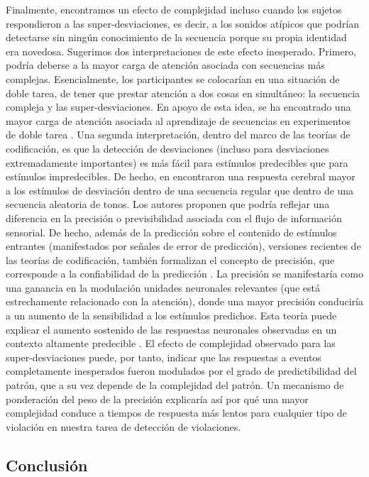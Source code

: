 Finalmente, encontramos un efecto de complejidad incluso cuando los sujetos respondieron a las super-desviaciones, es decir, a los sonidos atípicos que podrían detectarse sin ningún conocimiento de la secuencia porque su propia identidad era novedosa. Sugerimos dos interpretaciones de este efecto inesperado. Primero, podría deberse a la mayor carga de atención asociada con secuencias más complejas. Esencialmente, los participantes se colocarían en una situación de doble tarea, de tener que prestar atención a dos cosas en simultáneo: la secuencia compleja y las super-desviaciones. En apoyo de esta idea, se ha encontrado una mayor carga de atención asociada al aprendizaje de secuencias en experimentos de doble tarea \cite{f125}. Una segunda interpretación, dentro del marco de las teorías de codificación, es que la detección de desviaciones (incluso para desviaciones extremadamente importantes) es más fácil para estímulos predecibles que para estímulos impredecibles. De hecho, en \cite{f128} encontraron una respuesta cerebral mayor a los estímulos de desviación dentro de una secuencia regular que dentro de una secuencia aleatoria de tonos. Los autores proponen que podría reflejar una diferencia en la precisión o previsibilidad asociada con el flujo de información sensorial. De hecho, además de la predicción sobre el contenido de estímulos entrantes (manifestados por señales de error de predicción), versiones recientes de las teorías de codificación, también formalizan el concepto de precisión, que corresponde a la confiabilidad de la predicción \cite{f80,f129,f130,f131,f132}. La precisión se manifestaría como una ganancia en la modulación unidades neuronales relevantes (que está estrechamente relacionado con la atención), donde una mayor precisión conduciría a un aumento de la sensibilidad a los estímulos predichos. Esta teoría puede explicar el aumento sostenido de las respuestas neuronales observadas en un contexto altamente predecible \cite{f126,f128,f129,f133}. El efecto de complejidad observado para las super-desviaciones puede, por tanto, indicar que las respuestas a eventos completamente inesperados fueron modulados por el grado de predictibilidad del patrón, que a su vez depende de la complejidad del patrón. Un mecanismo de ponderación del peso de la precisión explicaría así por qué una mayor complejidad conduce a tiempos de respuesta más lentos para cualquier tipo de violación en nuestra tarea de detección de violaciones.

\subsection{Conclusión}

